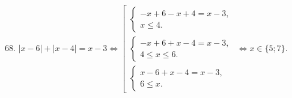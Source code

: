 68. $|x-6|+|x-4|=x-3\Leftrightarrow \left[\begin{array}{l}\begin{cases} -x+6-x+4=x-3,\\ x\leqslant 4.\end{cases}\\
\begin{cases} -x+6+x-4=x-3,\\ 4\leqslant x\leqslant 6 .\end{cases}\\\begin{cases} x-6+x-4=x-3,\\ 6\leqslant x.\end{cases}\end{array}\right.\Leftrightarrow
x\in\{5;7\}.$\\
